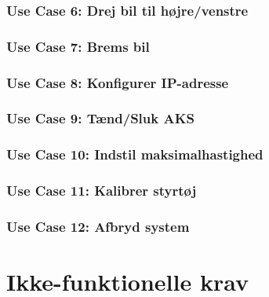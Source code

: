 \subsubsection{Use Case 6: Drej bil til højre/venstre}
\clearpage
\subsubsection{Use Case 7: Brems bil}
\subsubsection{Use Case 8: Konfigurer IP-adresse}
\clearpage
\subsubsection{Use Case 9: Tænd/Sluk AKS}
\clearpage
\subsubsection{Use Case 10: Indstil maksimalhastighed}
\clearpage
\subsubsection{Use Case 11: Kalibrer styrtøj}
\clearpage
\subsubsection{Use Case 12: Afbryd system}

\clearpage

\section{Ikke-funktionelle krav}

\clearpage